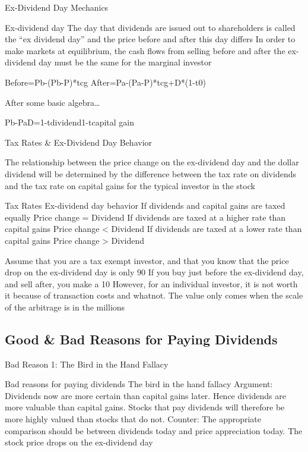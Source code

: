 \documentclass[10pt]{article}
\begin{document}
    \begin{core}{Ex-Dividend Day Mechanics}

      Ex-dividend day
      The day that dividends are issued out to shareholders is called the “ex dividend day” and the price before and after this day differs
      In order to make markets at equilibrium, the cash flows from selling before and after the ex-dividend day must be the same for the marginal investor

      Before=Pb-(Pb-P)*tcg
      After=Pa-(Pa-P)*tcg+D*(1-t0)

      After some basic algebra…

      Pb-PaD=1-tdividend1-tcapital gain

    \end{core}

    \begin{core}{Tax Rates \& Ex-Dividend Day Behavior}

      The relationship between the price change on the ex-dividend day and the dollar dividend will be determined by the difference between the tax rate on dividends and the tax rate on capital gains for the typical investor in the stock

      Tax Rates
      Ex-dividend day behavior
      If dividends and capital gains are taxed equally
      Price change = Dividend
      If dividends are taxed at a higher rate than capital gains
      Price change < Dividend
      If dividends are taxed at a lower rate than capital gains
      Price change > Dividend

      Assume that you are a tax exempt investor, and that you know that the price drop on the ex-dividend day is only 90%
      If you buy just before the ex-dividend day, and sell after, you make a 10%
      However, for an individual investor, it is not worth it because of transaction costs and whatnot. The value only comes when the scale of the arbitrage is in the millions

    \end{core}

  \subsection{Good \& Bad Reasons for Paying Dividends}

    \begin{core}{Bad Reason 1: The Bird in the Hand Fallacy}

      Bad reasons for paying dividends
      The bird in the hand fallacy
      Argument: Dividends now are more certain than capital gains later. Hence dividends are more valuable than capital gains. Stocks that pay dividends will therefore be more highly valued than stocks that do not.
      Counter: The appropriate comparison should be between dividends today and price appreciation today. The stock price drops on the ex-dividend day

    \end{core}
\end{document}
